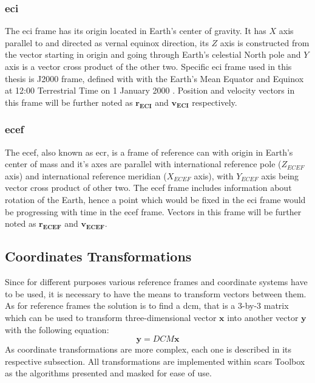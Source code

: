     \subsubsection{\ac*{eci}}
        The \ac{eci} frame has its origin located in Earth's center of gravity. It has $X$ axis parallel to and directed as vernal equinox direction, its $Z$ axis is constructed from the vector starting in origin and going through Earth's celestial North pole and $Y$ axis is a vector cross product of the other two. Specific \ac{eci} frame used in this thesis is J2000 frame, defined with with the Earth's Mean Equator and Equinox at 12:00 Terrestrial Time on 1 January 2000 \cite{schutz2004statistical}. Position and velocity vectors in this frame will be further noted as $\textbf{r}_\textbf{ECI}$ and $\textbf{v}_\textbf{ECI}$ respectively.

    \subsubsection{\ac*{ecef}}
        The \ac{ecef}, also known as \ac{ecr}, is a frame of reference can with origin in Earth's center of mass and it's axes are parallel with international reference pole ($Z_{ECEF}$ axis) and international reference meridian ($X_{ECEF}$ axis), with $Y_{ECEF}$ axis being vector cross product of other two. The \ac{ecef} frame includes information about rotation of the Earth, hence a point which would be fixed in the \ac{eci} frame would be progressing with time in the \ac{ecef} frame. Vectors in this frame will be further noted as $\textbf{r}_{\textbf{ECEF}}$ and $\textbf{v}_{\textbf{ECEF}}$.


\subsection{Coordinates Transformations}
    Since for different purposes various reference frames and coordinate systems have to be used, it is necessary to have the means to transform vectors between them. As for reference frames the solution is to find a \ac{dcm}, that is a 3-by-3 matrix which can be used to transform three-dimensional vector $\textbf{x}$ into another vector $\textbf{y}$ with the following equation:
    \begin{equation}
        \textbf{y} = DCM\textbf{x}
    \end{equation}
    As coordinate transformations are more complex, each one is described in its respective subsection. All transformations are implemented within \ac{scars} Toolbox as the algorithms presented and masked for ease of use.
    
